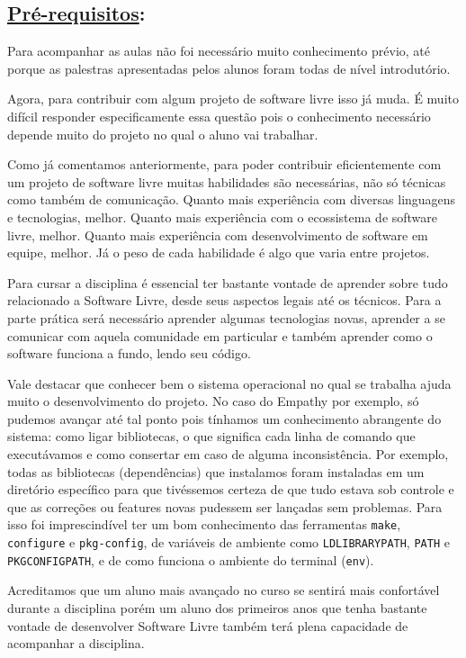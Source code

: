 \subsection*{\underline{Pré-requisitos}:}

Para acompanhar as aulas não foi necessário muito conhecimento prévio, até
porque as palestras apresentadas pelos alunos foram todas de nível introdutório.

Agora, para contribuir com algum projeto de software livre isso já muda. É muito
difícil responder especificamente essa questão pois o conhecimento necessário
depende muito do projeto no qual o aluno vai trabalhar.

Como já comentamos anteriormente, para poder contribuir eficientemente com um
projeto de software livre muitas habilidades são necessárias, não só técnicas
como também de comunicação. Quanto mais experiência com diversas linguagens e
tecnologias, melhor. Quanto mais experiência com o ecossistema de software
livre, melhor. Quanto mais experiência com desenvolvimento de software em
equipe, melhor. Já o peso de cada habilidade é algo que varia entre projetos.

Para cursar a disciplina é essencial ter bastante vontade de aprender sobre tudo
relacionado a Software Livre, desde seus aspectos legais até os técnicos. Para
a parte prática será necessário aprender algumas tecnologias novas, aprender a
se comunicar com aquela comunidade em particular e também aprender como o
software funciona a fundo, lendo seu código.

Vale destacar que conhecer bem o sistema operacional no qual se trabalha ajuda
muito o desenvolvimento do projeto. No caso do Empathy por exemplo, só pudemos
avançar até tal ponto pois tínhamos um conhecimento abrangente do sistema: como
ligar bibliotecas, o que significa cada linha de comando que executávamos e como
consertar em caso de alguma inconsistência. Por exemplo, todas as
bibliotecas (dependências) que instalamos foram instaladas em um diretório
específico para que tivéssemos certeza de que tudo  estava sob controle e que
as correções ou features novas pudessem ser lançadas sem problemas. Para isso
foi imprescindível ter um bom conhecimento das ferramentas \texttt{make},
\texttt{configure} e \texttt{pkg-config}, de variáveis de ambiente como
\texttt{LD\underline{\space}LIBRARY\underline{\space}PATH}, \texttt{PATH} e
\texttt{PKG\underline{\space}CONFIG\underline{\space}PATH}, e de como funciona
o ambiente do terminal (\texttt{env}).

Acreditamos que um aluno mais avançado no curso se sentirá mais confortável
durante a disciplina porém um aluno dos primeiros anos que tenha
bastante vontade de desenvolver Software Livre também terá plena capacidade de
acompanhar a disciplina.
